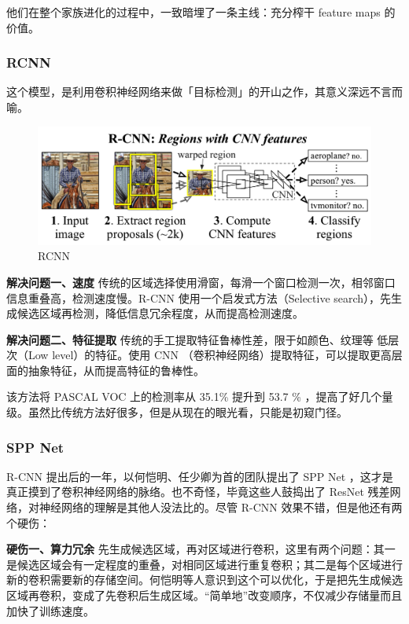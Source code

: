 他们在整个家族进化的过程中，一致暗埋了一条主线：充分榨干 feature maps 的价值。
\subsubsection{RCNN}
这个模型，是利用卷积神经网络来做「目标检测」的开山之作，其意义深远不言而喻。
\begin{figure}[h]
	\centering
	\includegraphics[width=\textwidth]{./Pictures/rcnn-regions_with_cnn_features.png}	
	\caption{RCNN}
\end{figure}

\textbf{解决问题一、速度}
传统的区域选择使用滑窗，每滑一个窗口检测一次，相邻窗口信息重叠高，检测速度慢。R-CNN 使用一个启发式方法（Selective search），先生成候选区域再检测，降低信息冗余程度，从而提高检测速度。

\textbf{解决问题二、特征提取}
传统的手工提取特征鲁棒性差，限于如颜色、纹理等 低层次（Low level）的特征。使用 CNN （卷积神经网络）提取特征，可以提取更高层面的抽象特征，从而提高特征的鲁棒性。

该方法将 PASCAL VOC 上的检测率从 35.1\% 提升到 53.7 \% ，提高了好几个量级。虽然比传统方法好很多，但是从现在的眼光看，只能是初窥门径。
\subsubsection{SPP Net}
R-CNN 提出后的一年，以何恺明、任少卿为首的团队提出了 SPP Net ，这才是真正摸到了卷积神经网络的脉络。也不奇怪，毕竟这些人鼓捣出了 ResNet 残差网络，对神经网络的理解是其他人没法比的。尽管 R-CNN 效果不错，但是他还有两个硬伤：

\textbf{硬伤一、算力冗余}
先生成候选区域，再对区域进行卷积，这里有两个问题：其一是候选区域会有一定程度的重叠，对相同区域进行重复卷积；其二是每个区域进行新的卷积需要新的存储空间。何恺明等人意识到这个可以优化，于是把先生成候选区域再卷积，变成了先卷积后生成区域。“简单地”改变顺序，不仅减少存储量而且加快了训练速度。


